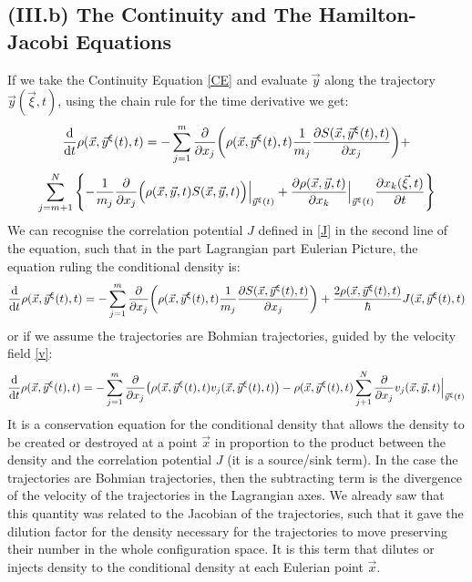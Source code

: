 \documentclass[11pt, a4paper]{article} %
\begin{document}
\subsection*{(III.b) The Continuity and The Hamilton-Jacobi Equations}
If we take the Continuity Equation \eqref{CE} and evaluate $\vec{y}$ along the trajectory $\vec{y}(\vec{\xi},t)$, using the chain rule for the time derivative we get:
\begin{equation}
\dv{}{t}\rho(\vec{x},\vec{y}^\xi(t),t)=-\sum_{j=1}^m\pdv{}{x_j}\qty(\rho(\vec{x}, \vec{y}^\xi(t), t) \frac{1}{m_j}\pdv{S(\vec{x}, \vec{y}^\xi(t), t)}{x_j}) + 
\end{equation}
$$
\sum_{j=m+1}^N\qty{ -\frac{1}{m_j}\pdv{}{x_j}\Big(\rho(\vec{x},\vec{y},t)S(\vec{x}, \vec{y}, t)\Big)\Big\rvert_{\vec{y}^\xi(t)}+\pdv{\rho(\vec{x}, \vec{y}, t)}{x_k}\Big\rvert_{\vec{y}^\xi(t)} \pdv{x_k(\vec{\xi},t)}{t}}
$$
We can recognise the correlation potential $J$ defined in \eqref{J} in the second line of the equation, such that in the part Lagrangian part Eulerian Picture, the equation ruling the conditional density is:
\begin{equation}\label{CE.EL}
\dv{}{t}\rho(\vec{x},\vec{y}^\xi(t),t)=-\sum_{j=1}^m\pdv{}{x_j}\qty(\rho(\vec{x}, \vec{y}^\xi(t), t) \frac{1}{m_j}\pdv{S(\vec{x}, \vec{y}^\xi(t), t)}{x_j}) + \frac{2\rho(\vec{x},\vec{y}^\xi(t),t)}{\hbar}J(\vec{x},\vec{y}^\xi(t),t)
\end{equation}
or if we assume the trajectories are Bohmian trajectories, guided by the velocity field \eqref{v}:
\begin{equation}\label{CE.EL.Bohm}
\dv{}{t}\rho(\vec{x},\vec{y}^\xi(t),t)=-\sum_{j=1}^m\pdv{}{x_j}\qty(\rho(\vec{x}, \vec{y}^\xi(t), t) v_j(\vec{x}, \vec{y}^\xi(t),t)) - \rho(\vec{x},\vec{y}^\xi(t),t)\sum_{j+1}^N \pdv{}{x_j}v_j(\vec{x}, \vec{y},t)\Big\rvert_{\vec{y}^\xi(t)}
\end{equation}
It is a conservation equation for the conditional density that allows the density to be created or destroyed at a point $\vec{x}$ in proportion to the product between the density and the correlation potential $J$ (it is a source/sink term). In the case the trajectories are Bohmian trajectories, then the subtracting term is the divergence of the velocity of the trajectories in the Lagrangian axes. We already saw that this quantity was related to the Jacobian of the trajectories, such that it gave the dilution factor for the density necessary for the trajectories to move preserving their number in the whole configuration space. It is this term that dilutes or injects density to the conditional density at each Eulerian point $\vec{x}$.
\end{document}
